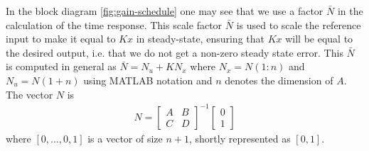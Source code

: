 In the block diagram \ref{fig:gain-schedule} one may see that we use a factor $\bar{N}$ in the calculation of the time response. This scale factor $\bar{N}$ is used to scale the reference input to make it equal to $K x$ in steady-state, ensuring that $K x$ will be equal to the desired output, i.e. that we do not get a non-zero steady state error. This $\bar{N}$ is computed in general as $\bar{N} = N_u + KN_x$ where $N_x = N(1:n)$ and $N_u = N(1+n)$ using MATLAB notation and $n$ denotes the dimension of $A$. The vector $N$ is
\begin{align*}
	N = \begin{bmatrix}
	A & B \\ 
	C & D
	\end{bmatrix} ^{-1}
	\begin{bmatrix}
	0 \\ 
	1
	\end{bmatrix}
\end{align*}
where $[0,...,0,1]$ is a vector of size $n+1$, shortly represented as $[0,1]$.